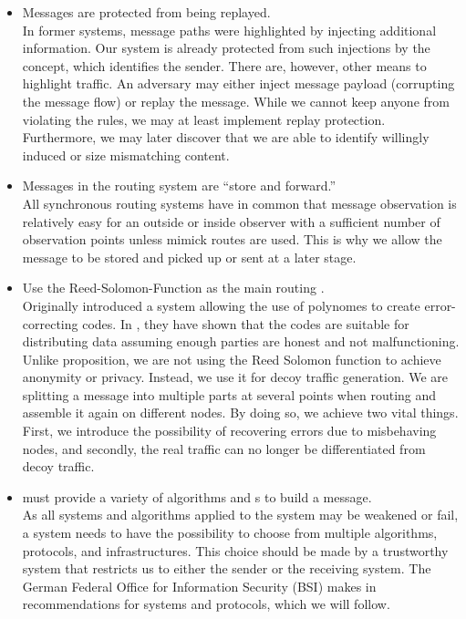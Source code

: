 \begin{itemize}
	\item Messages are protected from being replayed.\\
	In former systems, message paths were highlighted by injecting additional information. Our system is already protected from such injections by the  concept, which identifies the sender. There are, however, other means to highlight traffic. An adversary may either inject message payload (corrupting the message flow) or replay the message. While we cannot keep anyone from violating the rules, we may at least implement replay protection. Furthermore, we may later discover that we are able to identify willingly induced or size mismatching content.
	\item Messages in the routing system are ``store and forward.''\\
	All synchronous routing systems have in common that message observation is relatively easy for an outside or inside observer with a sufficient number of observation points unless mimick routes are used. This is why we allow the message to be stored and picked up or sent at a later stage. 
	\item Use the Reed-Solomon-Function as the main routing .\\
	Originally \cite{reed1960polynomial} introduced a system allowing the use of polynomes to create error-correcting codes. In \cite{chaum1988multiparty} \citeauthor{chaum1988multiparty}, they have shown that the codes are suitable for distributing data assuming enough parties are honest and not malfunctioning. Unlike \citeauthor{chaum1988multiparty} proposition, we are not using the Reed Solomon function to achieve anonymity or privacy. Instead, we use it for decoy traffic generation. We are splitting a message into multiple parts at several points when routing and assemble it again on different nodes. By doing so, we achieve two vital things. First, we introduce the possibility of recovering errors due to misbehaving nodes, and secondly, the real traffic can no longer be differentiated from decoy traffic. 
	\item \MessageVortex{} must provide a variety of algorithms and s to build a message.\\        
	As all systems and algorithms applied to the system may be weakened or fail, a system needs to have the possibility to choose from multiple algorithms, protocols, and infrastructures. This choice should be made by a trustworthy system that restricts us to either the sender or the receiving system. The German Federal Office for Information Security (BSI) makes in \cite{bsiPostQuantum} recommendations for systems and protocols, which we will follow.
	

\end{itemize}

